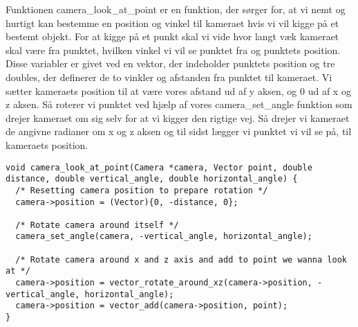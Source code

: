 Funktionen camera\_look\_at\_point er en funktion, der sørger for, at vi nemt og hurtigt kan bestemme en position og vinkel til kameraet hvis vi vil kigge på et bestemt objekt. 
For at kigge på et punkt skal vi vide hvor langt væk kameraet skal være fra punktet, hvilken vinkel vi vil se punktet fra og punktets position. Disse variabler er givet ved en vektor, der indeholder punktets position og tre doubles, der definerer de to vinkler og afstanden fra punktet til kameraet.
Vi sætter kameraets position til at være vores afstand ud af y aksen, og 0 ud af x og z aksen. Så roterer vi punktet ved hjælp af vores camera\_set\_angle funktion som drejer kameraet om sig selv for at vi kigger den rigtige vej.
Så drejer vi kameraet de angivne radianer om x og z aksen og til sidst lægger vi punktet vi vil se på, til kameraets position.

\begin{lstlisting}[style=Cstyle, caption=Kode-uddrag fra camera.c: camera\_look\_at\_point]
void camera_look_at_point(Camera *camera, Vector point, double distance, double vertical_angle, double horizontal_angle) {
  /* Resetting camera position to prepare rotation */
  camera->position = (Vector){0, -distance, 0};

  /* Rotate camera around itself */
  camera_set_angle(camera, -vertical_angle, horizontal_angle);
  
  /* Rotate camera around x and z axis and add to point we wanna look at */
  camera->position = vector_rotate_around_xz(camera->position, -vertical_angle, horizontal_angle);
  camera->position = vector_add(camera->position, point);
}
\end{lstlisting}
